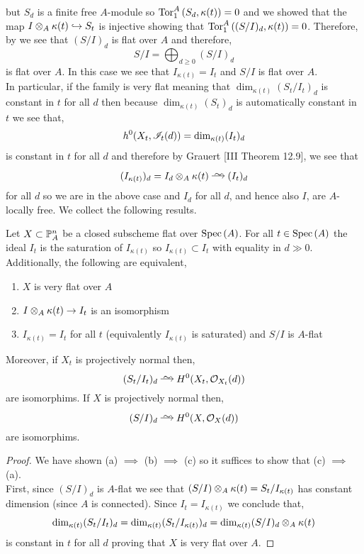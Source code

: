\documentclass[12pt]{article}
\begin{document}
\begin{center}
\end{center} 
but $S_d$ is a finite free $A$-module so $\Tor{A}{1}{S_d}{\kappa(t)} = 0$ and we showed that the map $I \ot_A \kappa(t) \embed S_t$ is injective showing that $\Tor{A}{1}{(S/I)_d}{\kappa(t)} = 0$. Therefore, by  we see that $(S/I)_d$ is flat over $A$ and therefore,
\[ S/I = \bigoplus_{d \ge 0} (S/I)_d \]
is flat over $A$. In this case we see that $I_{\kappa(t)} = I_t$ and $S/I$ is flat over $A$.
\bigskip\\
In particular, if the family is very flat meaning that $\dim_{\kappa(t)} (S_t/I_t)_d$ is constant in $t$ for all $d$ then because $\dim_{\kappa(t)} (S_t)_d$ is automatically constant in $t$ we see that,
\[ h^0(X_t, \I_t(d)) = \dim_{\kappa(t)} (I_t)_d \]
is constant in $t$ for all $d$ and therefore by Grauert [III Theorem 12.9], we see that
\[ (I_{\kappa(t)})_d = I_d \ot_A \kappa(t) \iso (I_t)_d \]
for all $d$ so we are in the above case and $I_d$ for all $d$, and hence also $I$, are $A$-locally free. We collect the following results.

\begin{prop}
Let $X \subset \P^n_A$ be a closed subscheme flat over $\Spec{A}$. For all $t \in \Spec{A}$ the ideal $I_t$ is the saturation of $I_{\kappa(t)}$ so $I_{\kappa(t)} \subset I_t$ with equality in $d \gg 0$. Additionally, the following are equivalent,
\begin{enumerate}
\item $X$ is very flat over $A$
\item $I \ot_A \kappa(t) \to I_t$ is an isomorphism  
\item $I_{\kappa(t)} = I_t$ for all $t$ (equivalently $I_{\kappa(t)}$ is saturated) and $S/I$ is $A$-flat
\end{enumerate}
Moreover, if $X_t$ is projectively normal then,
\[ (S_t/I_t)_d \iso H^0(X_t, \struct{X_t}(d)) \]
are isomorphims. If $X$ is projectively normal then,
\[ (S/I)_d \iso H^0(X, \struct{X}(d)) \]
are isomorphims.
\end{prop}

\begin{proof}
We have shown (a) $\implies$ (b) $\implies$ (c) so it suffices to show that (c) $\implies$ (a). 
\bigskip\\
First, since $(S/I)_d$ is $A$-flat we see that $(S/I) \ot_A \kappa(t) = S_{t} / I_{\kappa(t)}$ has constant dimension (since $A$ is connected). Since $I_t = I_{\kappa(t)}$ we conclude that,
\[ \dim_{\kappa(t)} (S_t/I_t)_d = \dim_{\kappa(t)} (S_t/I_{\kappa(t)})_d = \dim_{\kappa(t)} (S/I)_d \ot_A \kappa(t) \]
is constant in $t$ for all $d$ proving that $X$ is very flat over $A$. 
\end{proof}
\end{document}

